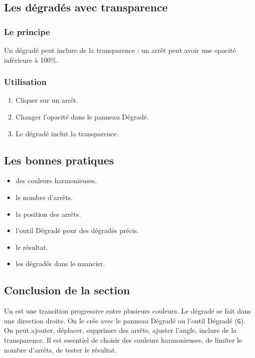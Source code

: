 \subsection{Les dégradés avec transparence}

\subsubsection{Le principe}

Un dégradé peut inclure de la transparence : un arrêt peut avoir une opacité inférieure à 100\%.

\subsubsection{Utilisation}

\begin{enumerate}
    \item Cliquer sur un arrêt.
    \item Changer l'opacité dans le panneau Dégradé.
    \item Le dégradé inclut la transparence.
\end{enumerate}

\subsection{Les bonnes pratiques}

\begin{itemize}
    \item {} des couleurs harmonieuses.
    \item {} le nombre d'arrêts.
    \item {} la position des arrêts.
    \item {} l'outil Dégradé pour des dégradés précis.
    \item {} le résultat.
    \item {} les dégradés dans le nuancier.
\end{itemize}

\subsection*{Conclusion de la section}

Un  est une transition progressive entre plusieurs couleurs. Le dégradé  se fait dans une direction droite. On le crée avec le panneau Dégradé ou l'outil Dégradé (\texttt{G}). On peut ajouter, déplacer, supprimer des arrêts, ajuster l'angle, inclure de la transparence. Il est essentiel de choisir des couleurs harmonieuses, de limiter le nombre d'arrêts, de tester le résultat.

